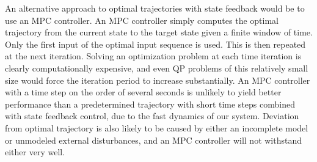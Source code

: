 An alternative approach to optimal trajectories with state feedback would be to use an MPC controller. An MPC controller simply computes the optimal trajectory from the current state to the target state given a finite window of time. Only the first input of the optimal input sequence is used. This is then repeated at the next iteration. Solving an optimization problem at each time iteration is clearly computationally expensive, and even QP problems of this relatively small size would force the iteration period to increase substantially. An MPC controller with a time step on the order of several seconds is unlikely to yield better performance than a predetermined trajectory with short time steps combined with state feedback control, due to the fast dynamics of our system. Deviation from optimal trajectory is also likely to be caused by either an incomplete model or unmodeled external disturbances, and an MPC controller will not withstand either very well. 








